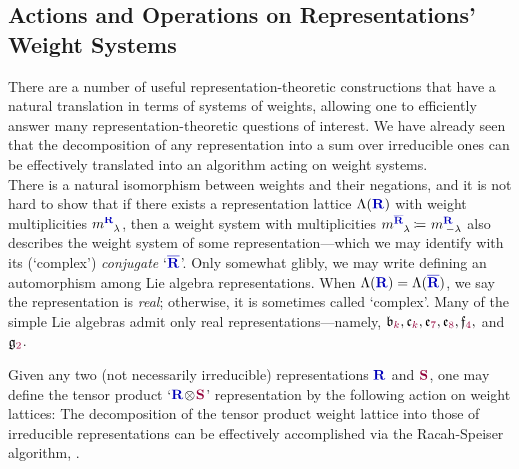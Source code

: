 \documentclass[12pt,a4paper]{article}\let\ifpdf\relax
\begin{document}
\subsection{Actions and Operations on Representations' Weight Systems}\label{rep_operations_via_weights}\vspace{-4pt}

There are a number of useful representation-theoretic constructions that have a natural translation in terms of systems of weights, allowing one to efficiently answer many representation-theoretic questions of interest. We have already seen that the decomposition of any representation into a sum over irreducible ones can be effectively translated into an algorithm acting on weight systems.\\[-10pt]

There is a natural isomorphism between weights and their negations, and it is not hard to show that if there exists a representation lattice $\Lambda(\mathbf{\b{R}})$ with weight multiplicities $m\indices{\mathbf{\b{R}}}{\lambda}$, then a weight system with multiplicities $m\indices{\mathbf{\b{\bar{R}}}}{\lambda}\equivR m\indices{\mathbf{\b{R}}}{\hspace{-5pt}{-}\lambda}$ also describes the weight system of some representation---which we may identify with its (`complex') \emph{conjugate} `$\mathbf{\b{\bar{R}}}$'. Only somewhat glibly, we may write
%
%
defining an automorphism among Lie algebra representations. When $\Lambda(\mathbf{\b{R}})=\Lambda(\mathbf{\b{\bar{R}}})$, we say the representation is \emph{real}; otherwise, it is sometimes called `complex'. Many of the simple Lie algebras admit only real representations---namely, $\mathfrak{b}_{\r{k}},\mathfrak{c}_{\r{k}},\mathfrak{e}_{\r{7}},\mathfrak{e}_{\r{8}},\mathfrak{f}_{\r{4}},$ and $\mathfrak{g}_{\r{2}}$.

Given any two (not necessarily irreducible) representations $\mathbf{\b{R}}$ and $\mathbf{\r{S}}$, one may define the tensor product `$\mathbf{\b{R}}\!\otimes\!\mathbf{\r{S}}$' representation by the following action on weight lattices:
%
%
The decomposition of the tensor product weight lattice into those of irreducible representations can be effectively accomplished via the Racah-Speiser algorithm, \cite{MR170975,MR171552}.\\[-10pt]
\end{document}
